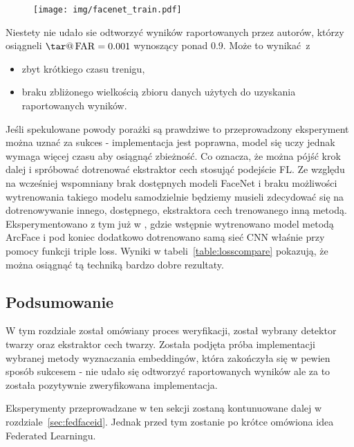 \begin{figure}[h]
  \centering
  \texttt{[image: img/facenet\_train.pdf]}
  \caption{\fedavglong}%
  \label{fig:facenet_train}%
\end{figure}

Niestety nie udało sie odtworzyć wyników raportowanych przez autorów, którzy osiągneli
\(\tar@\far=\num{0.001}\) wynoszący ponad \num{0.9}. Może to wynikać z
\begin{itemize}
    \item zbyt krótkiego czasu trenigu,
    \item braku zbliżonego wielkością zbioru danych użytych do uzyskania raportowanych wyników.
\end{itemize}

Jeśli spekulowane powody porażki są prawdziwe to przeprowadzony eksperyment można uznać za sukces
- implementacja jest poprawna, model się uczy jednak wymaga więcej czasu aby osiągnąć zbieżność.
Co oznacza, że można pójść krok dalej i spróbować dotrenować ekstraktor cech stosująć podejście
FL. Ze względu na wcześniej wspomniany brak dostępnych modeli FaceNet i braku możliwości
wytrenowania takiego modelu samodzielnie będziemy musieli zdecydować się na dotrenowywanie
innego, dostępnego, ekstraktora cech trenowanego inną metodą. Eksperymentowano z tym już w
\cite{Arcface}, gdzie wstępnie wytrenowano model metodą ArcFace i pod koniec dodatkowo
dotrenowano samą sieć CNN właśnie przy pomocy funkcji triple loss. Wyniki w
tabeli~\ref{table:losscompare} pokazują, że można osiągnąć tą techniką bardzo dobre rezultaty.

\subsection{Podsumowanie}
W tym rozdziale został omówiany proces weryfikacji, został wybrany detektor twarzy oraz
ekstraktor cech twarzy. Została podjęta próba implementacji wybranej metody wyznaczania
embeddingów, która zakończyła się w pewien sposób sukcesem - nie udało się odtworzyć
raportowanych wyników ale za to została pozytywnie zweryfikowana implementacja.

Eksperymenty przeprowadzane w ten sekcji zostaną kontunuowane dalej w rozdziale~\ref{sec:fedfaceid}. Jednak przed tym zostanie po krótce omówiona idea Federated Learningu.




